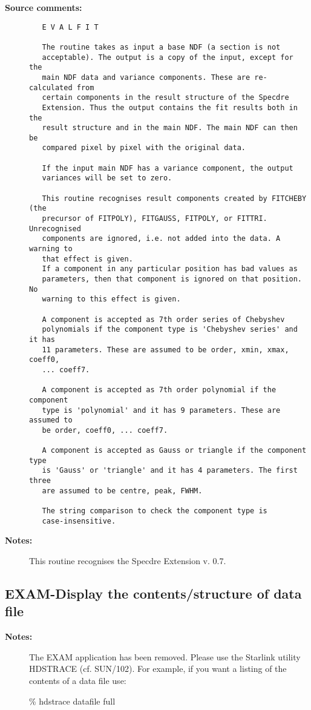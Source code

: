 \begin{description}
\begin{verbatim}
\end{verbatim}

\item [{\bf Source comments:}]
\begin{verbatim}
   E V A L F I T

   The routine takes as input a base NDF (a section is not
   acceptable). The output is a copy of the input, except for the
   main NDF data and variance components. These are re-calculated from
   certain components in the result structure of the Specdre
   Extension. Thus the output contains the fit results both in the
   result structure and in the main NDF. The main NDF can then be
   compared pixel by pixel with the original data.

   If the input main NDF has a variance component, the output
   variances will be set to zero.

   This routine recognises result components created by FITCHEBY (the
   precursor of FITPOLY), FITGAUSS, FITPOLY, or FITTRI. Unrecognised
   components are ignored, i.e. not added into the data. A warning to
   that effect is given.
   If a component in any particular position has bad values as
   parameters, then that component is ignored on that position. No
   warning to this effect is given.

   A component is accepted as 7th order series of Chebyshev
   polynomials if the component type is 'Chebyshev series' and it has
   11 parameters. These are assumed to be order, xmin, xmax, coeff0,
   ... coeff7.

   A component is accepted as 7th order polynomial if the component
   type is 'polynomial' and it has 9 parameters. These are assumed to
   be order, coeff0, ... coeff7.

   A component is accepted as Gauss or triangle if the component type
   is 'Gauss' or 'triangle' and it has 4 parameters. The first three
   are assumed to be centre, peak, FWHM.

   The string comparison to check the component type is
   case-insensitive.

\end{verbatim}

\item [{\bf Notes:}]
This routine recognises the Specdre Extension v. 0.7.
\end{description}
\subsection{EXAM-\label{EXAM}Display the contents/structure of data file}
\begin{description}

\item [{\bf Notes:}]
 The EXAM application has been removed. Please use the Starlink utility
 HDSTRACE (cf. SUN/102).  For example, if you want a listing of the
 contents of a data file use:

    \% hdstrace datafile full
\end{description}
